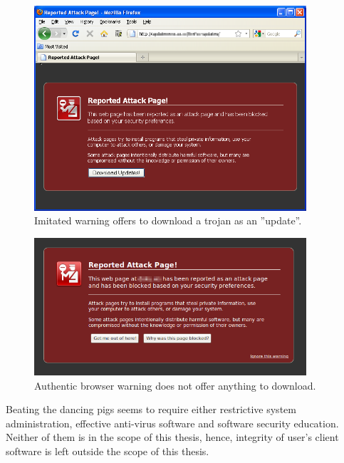 \documentclass[english,gradu]{tktltiki}
\begin{document}
            \begin{figure}
              \centering
              \includegraphics[width=0.9\textwidth]{images/firefox_reported_attack_page_trojan.png}
              \caption{Imitated warning offers to download a trojan as an ''update''.}

              \label{fig:ff_malicious_warning}
            \end{figure}

            \begin{figure}
              \centering
              \includegraphics[width=0.9\textwidth]{images/firefox_reported_attack_page_authentic.png}
              \caption{Authentic browser warning does not offer anything to download.}

              \label{fig:ff_authentic_warning}
            \end{figure}

              Beating the dancing pigs \cite{schneier_secrets_and_lies_2000} seems to require either restrictive system administration, effective anti-virus software and software security education. Neither of them is in the scope of this thesis, hence, integrity of user's client software is left outside the scope of this thesis.
\end{document}

